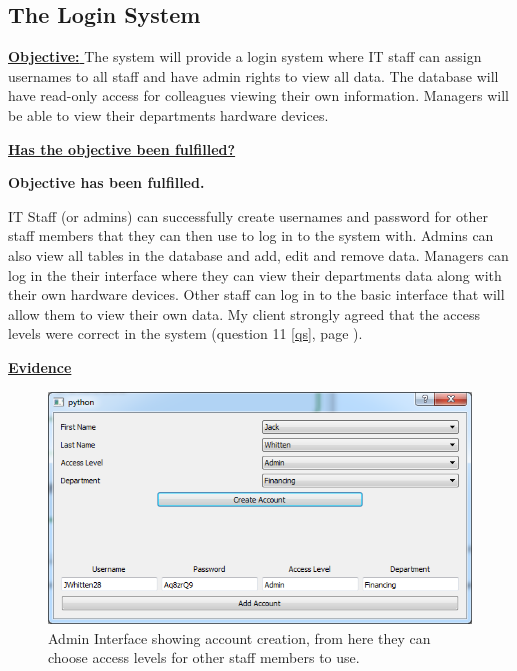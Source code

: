 \subsection{The Login System}

\underline{\textbf{Objective:} } The system will provide a login system where IT staff can assign usernames to all staff and have admin rights to view all data. The database will have read-only access for colleagues viewing their own information. Managers will be able to view their departments hardware devices.

\underline{\textbf{Has the objective been fulfilled?}}

\textbf{Objective has been fulfilled.}

IT Staff (or admins) can successfully create usernames and password for other staff members that they can then use to log in to the system with. Admins can also view all tables in the database and add, edit and remove data. Managers can log in the their interface where they can view their departments data along with their own hardware devices. Other staff can log in to the basic interface that will allow them to view their own data. My client strongly agreed that the access levels were correct in the system (question 11 \ref{qs}, page \pageref{qs}).

\underline{\textbf{Evidence}}

\begin{figure}[H]
    \includegraphics[width=\textwidth]{./Evaluation/Images/login1.png}
    \caption{Admin Interface showing account creation, from here they can choose access levels for other staff members to use.} 
\end{figure}

